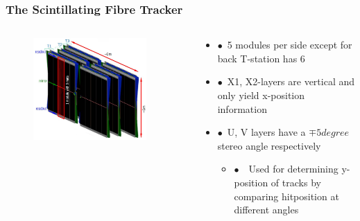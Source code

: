 \documentclass[aspectratio=1610, 12pt, xcolor=dvipsnames]{beamer}
\begin{document}
\begin{frame}
\begin{columns}
\begin{column}{0.48\textwidth}
\begin{figure}
      \end{figure}
    \end{column}
  \end{columns}
\end{frame}

\begin{frame}\frametitle{The Scintillating Fibre Tracker}
  \begin{columns}
    \begin{column}[c]{0.48\textwidth}
      \begin{figure}
        \includegraphics[width=0.9\textwidth]{logos/scifi.png}
      \end{figure}
    \end{column}
    \begin{column}{0.48\textwidth}
      \begin{itemize}
        \item $\bullet$\, 5 modules per side except for back T-station has 6
        \item $\bullet$\, X1, X2-layers are vertical and only yield x-position information
        \item $\bullet$\, U, V layers have a $\mp 5 \si{degree}$ stereo angle respectively
        \begin{itemize}
          \item $\bullet$\, \to\, Used for determining y-position of tracks by comparing hitposition at different angles
        \end{itemize}
      \end{itemize}
    \end{column}
  \end{columns}
\end{frame}
\end{document}
